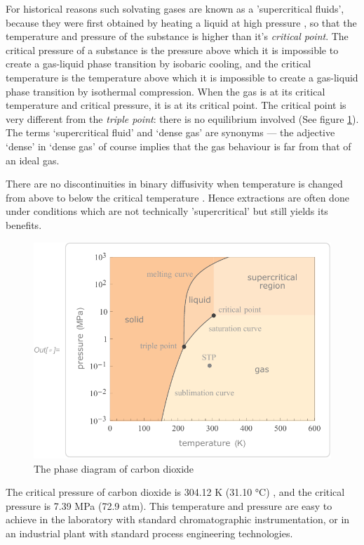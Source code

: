 For historical reasons such solvating gases are known as a 'supercritical
fluids', because they were first obtained by heating a liquid at high pressure
\autocite{Berche2009}, so that the temperature and pressure of the substance is
higher than it's \textit{critical point}. The critical pressure of a substance
is the pressure above which it is impossible to create a gas-liquid phase
transition by isobaric cooling, and the critical temperature is the temperature
above which it is impossible to create a gas-liquid phase transition by
isothermal compression.
When the gas is at its critical temperature and critical pressure, it is at its
critical point. The critical point is very different from the \textit{triple
point}: there is no equilibrium involved (See figure \ref{fig:co2phase}). The
terms `supercritical fluid' and `dense gas' are synonyms \autocite{Randall1982}
--- the adjective `dense' in `dense gas' of course implies that the gas
behaviour is far from that of an ideal gas.

There are no discontinuities in binary diffusivity when temperature is changed
from above to below the critical temperature \autocite{Lauer1983}. Hence
extractions are often done under conditions which are not technically
'supercritical' but still yields its benefits.


\begin{figure}
\centering
\includegraphics[width=\textwidth]{Figures/CO2PhaseDiagram}
\decoRule
\caption[The carbon dioxide phase diagram]{The phase diagram of carbon dioxide}
\label{fig:co2phase}
\end{figure}

The critical pressure of carbon dioxide is 304.12 K (31.10 °C) , and the
critical pressure is 7.39 MPa (72.9 atm). This temperature and pressure are easy
to achieve in the laboratory with standard chromatographic instrumentation, or
in an industrial plant with standard process engineering technologies.


